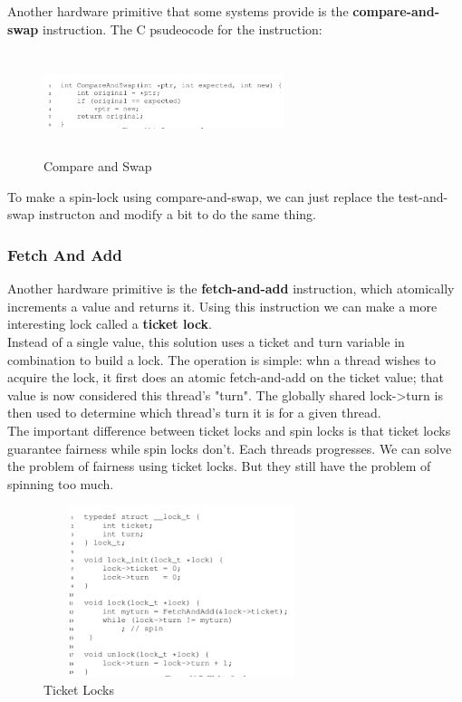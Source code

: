 Another hardware primitive that some systems provide is the \textbf{compare-and-
swap} instruction. The C psudeocode for the instruction:

\begin{figure}[h!]
    \begin{center}
        \includegraphics[width=7cm, height=3cm]{img/284.png}
        \caption{Compare and Swap}
    \end{center}
\end{figure}

To make a spin-lock using compare-and-swap, we can just replace the test-and-swap
instructon and modify a bit to do the same thing.

\subsubsection{Fetch And Add}

Another hardware primitive is the \textbf{fetch-and-add} instruction, which
atomically increments a value and returns it. Using this instruction we can make
a more interesting lock called a \textbf{ticket lock}.\\

Instead of a single value, this solution uses a ticket and turn variable in
combination to build a lock. The operation is simple: whn a thread wishes to
acquire the lock, it first does an atomic fetch-and-add on the ticket value;
that value is now considered this thread's "turn". The globally shared lock->turn
is then used to determine which thread's turn it is for a given thread. \\

The important difference between ticket locks and spin locks is that ticket
locks guarantee fairness while spin locks don't. Each threads progresses. We
can solve the problem of fairness using ticket locks. But they still have
the problem of spinning too much.

\begin{figure}[h!]
    \begin{center}
        \includegraphics[width=8cm, height=5cm]{img/287.png}
        \caption{Ticket Locks}
    \end{center}
\end{figure}

